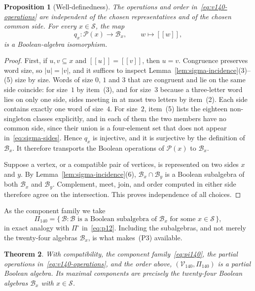 \documentclass{article}   	%
\theoremstyle{plain}
\newtheorem{theorem}{Theorem}[section]
\newtheorem{proposition}[theorem]{Proposition}
\theoremstyle{definition}
\theoremstyle{remark}
\begin{document}
\begin{proposition}[Well-definedness]
\label{prop:v140-welldefined}
The operations and order in~\eqref{eq:v140-operations} are independent of the
chosen representatives and of the chosen common side.
For every $x\in\mathcal S$, the map
\[
q_x:\mathcal P(x)\longrightarrow\mathcal B_x,
\qquad w\longmapsto[[w]],
\]
is a Boolean-algebra isomorphism.
\end{proposition}

\begin{proof}
First, if $u,v\subseteq x$ and $[[u]]=[[v]]$, then $u=v$.  Congruence
preserves word size, so $|u|=|v|$, and it suffices to inspect
Lemma~\ref{lem:sigma-incidence}(3)--(5) size by size.  Words of size $0$, $1$
and $3$ that are congruent and lie on the same side coincide: for size~$1$ by
item~(3), and for size~$3$ because a three-letter word lies on only one side,
sides meeting in at most two letters by item~(2).  Each side contains exactly
one word of size~$4$.  For size~$2$, item~(5) lists the eighteen non-singleton
classes explicitly, and in each of them the two members have no common side,
since their union is a four-element set that does not appear
in~\eqref{eq:sigma-sides}.  Hence $q_x$ is injective,
and it is surjective by the definition of $\mathcal B_x$.  It therefore
transports the Boolean operations of $\mathcal P(x)$ to $\mathcal B_x$.

Suppose a vertex, or a compatible pair of vertices, is represented on two sides
$x$ and $y$.  By Lemma~\ref{lem:sigma-incidence}(6),
$\mathcal B_x\cap\mathcal B_y$ is a Boolean subalgebra of both
$\mathcal B_x$ and $\mathcal B_y$.  Complement, meet, join, and order computed
in either side therefore agree on the intersection.  This proves independence
of all choices.
\end{proof}

As the component family we take
\begin{equation}
\label{eq:pi140}
\Pi_{140}
=\{\,\mathcal B:\mathcal B\text{ is a Boolean subalgebra of }
        \mathcal B_x\text{ for some }x\in\mathcal S\,\},
\end{equation}
in exact analogy with $\Pi^\circ$ in~\eqref{eq:p12}.  Including the
subalgebras, and not merely the twenty-four algebras $\mathcal B_x$, is what
makes~\rm(P3) available.

\begin{theorem}
\label{thm:v140-pba}
With compatibility, the component family~\eqref{eq:pi140}, the partial
operations in~\eqref{eq:v140-operations}, and the order above,
$(\mathcal V_{140},\Pi_{140})$ is a partial Boolean algebra.  Its maximal
components are precisely the twenty-four Boolean algebras
$\mathcal B_x$ with $x\in\mathcal S$.
\end{theorem}
\end{document}
